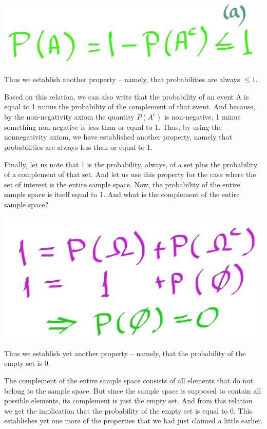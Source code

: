 \documentclass{tufte-handout}
\begin{document}
\begin{marginfigure}
  \includegraphics{ProbsLeq1}
  \caption{Thus we establish another property -- namely, that probabilities are always $\leq 1$.}
\end{marginfigure}

Based on this relation, we can also write that the probability of an event A is equal to 1 minus the
probability of the complement of that event. And because, by the non-negativity axiom the quantity $P(A^c)$
is non-negative, 1 minus something non-negative is less than or equal to 1. Thus, by using the nonnegativity
axiom, we have established another property, namely that probabilities are always less
than or equal to 1.

Finally, let us note that 1 is the probability, always, of a set plus the probability of a complement of that
set. And let us use this property for the case where the set of interest is the entire sample space. Now,
the probability of the entire sample space is itself equal to 1. And what is the complement of the entire
sample space?

\begin{marginfigure}
  \includegraphics{ProbEmpty}
  \caption{Thus we establish yet another property -- namely, that the probability of the empty set is $0$.}
\end{marginfigure}

The complement of the entire sample space consists of all elements that do not belong to the sample
space. But since the sample space is supposed to contain all possible elements, its complement is just
the empty set. And from this relation we get the implication that the probability of the empty set is equal
to 0. This establishes yet one more of the properties that we had just claimed a little earlier.
\end{document}

